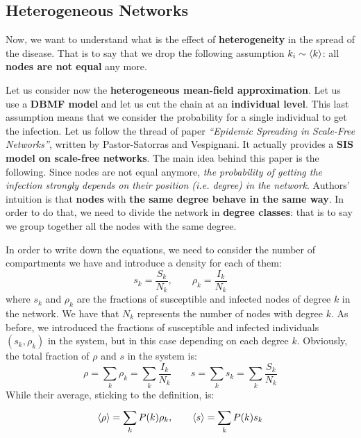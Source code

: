 \documentclass[../main/main.tex]{subfiles}
\begin{document}


\subsection{Heterogeneous Networks}

Now, we want to understand what is the effect of \textbf{heterogeneity} in the spread of the disease. That is to say that we drop the following assumption \( k_i \sim \expval{k}  \): all \textbf{nodes are not equal} any more.

Let us consider now the \textbf{heterogeneous mean-field approximation}. Let us use a \textbf{DBMF model} and let us cut the chain at an \textbf{individual level}. This last assumption means that we consider the probability for a single individual to get the infection.
Let us follow the thread of paper \textit{“Epidemic Spreading in Scale-Free Networks”}, written by Pastor-Satorras and Vespignani. It actually provides a \textbf{SIS model on scale-free networks}. The main idea behind this paper is the following. Since nodes are not equal anymore, \textit{the probability of getting the infection strongly depends on their position (i.e. degree) in the network}. Authors' intuition is that \textbf{nodes} with \textbf{the same degree behave in the same way}. In order to do that, we need to divide the network in \textbf{degree classes}: that is to say we group together all the nodes with the same degree.


In order to write down the equations, we need to consider the number of compartments we have and introduce a density for each of them:
\begin{equation*}
  s_k = \frac{S_k}{N_k}, \qquad \rho _k = \frac{I_k}{N_k}
\end{equation*}
where \( s_k \) and \( \rho _k \) are the fractions of susceptible and infected nodes of degree \( k \) in the network. We have that \( N_k \) represents the number of nodes with degree \( k \). As before, we introduced the fractions of susceptible and infected individuals $(s_k, \rho_k)$ in the system, but in this case depending on each degree \( k \).
Obviously, the total fraction of \( \rho  \) and \( s \) in the system is: 
\begin{equation*}
    \rho = \sum_k \rho_k = \sum_k \frac{I_k}{N_k} \qquad s = \sum_k s_k = \sum_k \frac{S_k}{N_k}
\end{equation*}
While their average, sticking to the definition, is:
\begin{equation}
  \expval{\rho} = \sum_{k}^{} P(k) \rho _k, \qquad \expval{s} = \sum_{k}^{} P(k) s_k
\end{equation}
\end{document}
